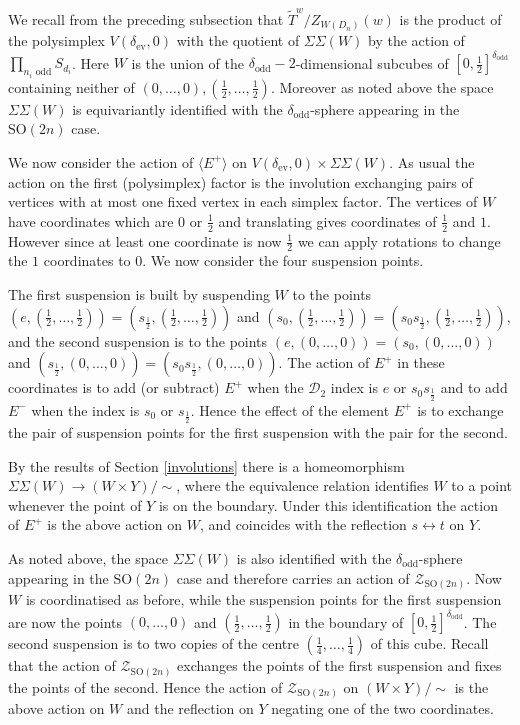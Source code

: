 \documentclass[11pt,a4paper]{article}
\def\SO{\mathrm{SO}}
\def\D{\mathcal{D}}
\def\cZ{\mathcal{Z}}
\def\cZ{{\mathcal Z}}
\def\coveringtorus{\tilde{T}}
\def\ev{\mathrm{ev}}
\def\odd{\mathrm{odd}}
\def\ZDSO{\cZ_{\SO(2n)}}
\begin{document}
We recall from the preceding subsection that $\coveringtorus^w/Z_{W(D_n)}(w)$ is the product of the polysimplex $V(\delta_\ev,0)$ with the quotient of $\Sigma\Sigma(W)$ by the action of $\prod\limits_{n_i\text{ odd}} S_{d_i}$. Here $W$ is the union of the ${\delta_\odd}-2$-dimensional subcubes of $[0,\frac 12]^{{\delta_\odd}}$ containing neither of $(0,\dots,0),(\frac12,\dots,\frac12)$. Moreover as noted above the space $\Sigma\Sigma(W)$ is equivariantly identified with the ${\delta_\odd}$-sphere appearing in the $\SO(2n)$ case.

We now consider the action of $\langle E^+\rangle$ on $V(\delta_\ev,0)\times \Sigma\Sigma(W)$. As usual the action on the first (polysimplex) factor is the involution exchanging pairs of vertices with at most one fixed vertex in each simplex factor. The vertices of $W$ have coordinates which are $0$ or $\frac 12$ and translating gives coordinates of $\frac 12$ and $1$.  However since at least one coordinate is now $\frac 12$ we can apply rotations to change the $1$ coordinates to $0$.  We now consider the four suspension points.

The first suspension is built by suspending $W$ to the points $(e,(\frac 12,\dots,\frac 12))=(s_{\!\frac 12},(\frac 12,\dots,\frac 12))$ and $(s_0,(\frac 12,\dots,\frac 12))=(s_0s_{\!\frac 12},(\frac 12,\dots,\frac 12))$, and the second suspension is to the points $(e,(0,\dots,0))=(s_0,(0,\dots,0))$ and $(s_{\!\frac 12},(0,\dots,0))=(s_0s_{\!\frac 12},(0,\dots,0))$. The action of $E^+$ in these coordinates  is to add (or subtract) $E^+$ when the $\D_2$ index is $e$ or $s_0s_{\!\frac 12}$ and to add $E^-$ when the index is $s_0$ or $s_{\!\frac 12}$. Hence the effect of the element $E^+$ is to exchange the pair of suspension points for the first suspension with the pair for the second.

By the results of Section \ref{involutions} there is a homeomorphism $\Sigma\Sigma(W)\to (W\times Y)/\sim$, where the equivalence relation identifies $W$ to a point whenever the point of $Y$ is on the boundary. Under this identification the action of $E^+$ is the above action on $W$, and coincides with the reflection $s\leftrightarrow t$ on $Y$.

As noted above, the space $\Sigma\Sigma(W)$ is also identified with the ${\delta_\odd}$-sphere appearing in the $\SO(2n)$ case and therefore carries an action of $\ZDSO$. Now $W$ is coordinatised as before, while the suspension points for the first suspension are now the points $(0,\dots,0)$ and $(\frac 12,\dots,\frac 12)$ in the boundary of $[0,\frac 12]^{\delta_\odd}$. The second suspension is to two copies of the centre $(\frac 14,\dots,\frac 14)$ of this cube.  Recall that the action of $\ZDSO$ exchanges the points of the first suspension and fixes the points of the second. Hence the action of $\ZDSO$ on $(W\times Y)/\sim$ is the above action on $W$ and the reflection on $Y$ negating one of the two coordinates.
\end{document}
